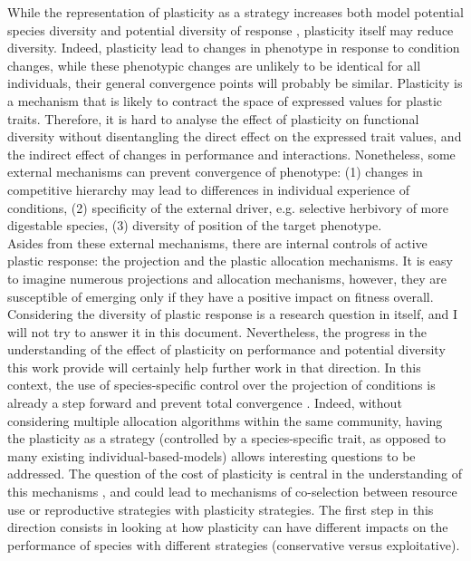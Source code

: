 While the representation of plasticity as a strategy increases both model potential species diversity and potential diversity of response \parencite{ ryser_consequences_2000, kichenin_contrasting_2013}, plasticity itself may reduce diversity. Indeed, plasticity lead to changes in phenotype in response to condition changes, while these phenotypic changes are unlikely to be identical for all individuals, their general convergence points will probably be similar. Plasticity is a mechanism that is likely to contract the space of expressed values for plastic traits. Therefore, it is hard to analyse the effect of plasticity on functional diversity without disentangling the direct effect on the expressed trait values, and the indirect effect of changes in performance and interactions. Nonetheless, some external mechanisms  can prevent convergence of phenotype: (1) changes in competitive hierarchy may lead to differences in individual experience of conditions, (2) specificity of the external driver, e.g. selective herbivory of more digestable species, (3) diversity of position of the target phenotype. \\
Asides from these external mechanisms, there are internal controls of active plastic response: the projection and the plastic allocation mechanisms. It is easy to imagine numerous projections and allocation mechanisms, however, they are susceptible of emerging only if they have a positive impact on fitness overall. Considering the diversity of plastic response is a research question in itself, and I will not try to answer it in this document. Nevertheless, the progress in the understanding of the effect of plasticity on performance and potential diversity this work provide will certainly help further work in that direction. In this context, the use of species-specific control over the projection of conditions is already a step forward and prevent total convergence . Indeed, without considering multiple allocation algorithms within the same community, having the plasticity as a strategy \parencite{bradshaw_unravelling_2006} (controlled by a species-specific trait, as opposed to many existing individual-based-models) allows interesting questions to be addressed. The question of the cost of plasticity is central in the understanding of this mechanisms \parencite{dewitt_costs_1998, auld_re-evaluating_2009}, and could lead to mechanisms of co-selection between resource use or reproductive strategies with plasticity strategies. The first step in this direction consists in looking at how plasticity can have different impacts on the performance of species with different strategies (conservative versus exploitative).



